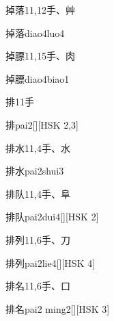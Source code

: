 \begin{entry}{掉落}{11,12}{⼿、⾋}
  \begin{phonetics}{掉落}{diao4luo4}
  \end{phonetics}
\end{entry}

\begin{entry}{掉膘}{11,15}{⼿、⾁}
  \begin{phonetics}{掉膘}{diao4biao1}
  \end{phonetics}
\end{entry}

\begin{entry}{排}{11}{⼿}
  \begin{phonetics}{排}{pai2}[][HSK 2,3]
  \end{phonetics}
\end{entry}

\begin{entry}{排水}{11,4}{⼿、⽔}
  \begin{phonetics}{排水}{pai2shui3}
  \end{phonetics}
\end{entry}

\begin{entry}{排队}{11,4}{⼿、⾩}
  \begin{phonetics}{排队}{pai2dui4}[][HSK 2]
  \end{phonetics}
\end{entry}

\begin{entry}{排列}{11,6}{⼿、⼑}
  \begin{phonetics}{排列}{pai2lie4}[][HSK 4]
  \end{phonetics}
\end{entry}

\begin{entry}{排名}{11,6}{⼿、⼝}
  \begin{phonetics}{排名}{pai2 ming2}[][HSK 3]
  \end{phonetics}
\end{entry}

